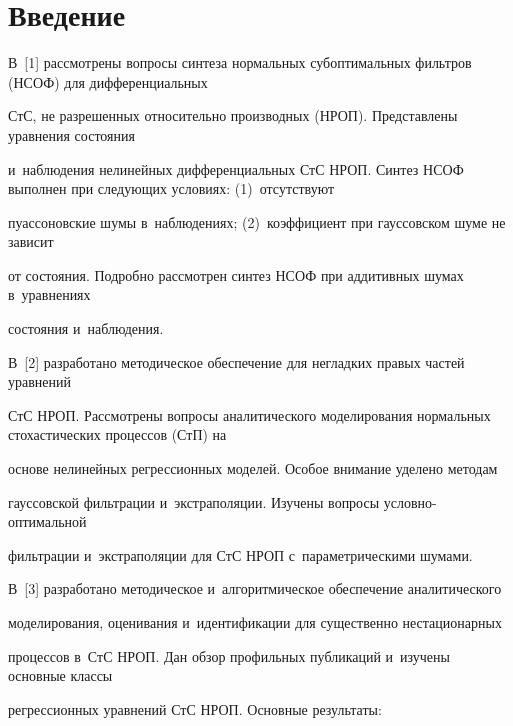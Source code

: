  \thispagestyle{headings}

 

 \vspace*{-22pt}



\section{Введение}



\vspace*{-4pt}





В~[1] рассмотрены вопросы синтеза нормальных субоптимальных фильт\-ров (НСОФ) для дифференциальных 

СтС, не разрешенных относительно производных (НРОП). Представлены уравнения состояния 

и~наблюдения нелинейных дифференциальных СтС НРОП. Синтез НСОФ выполнен при следующих условиях: (1)~отсутствуют 

пуассоновские шумы в~наблюдениях; (2)~коэффициент при гауссовском шуме не зависит 

от состояния. Подробно рассмотрен синтез НСОФ при аддитивных шумах в~уравнениях 

состояния и~наблюдения.

В~[2] разработано методическое обеспечение для негладких правых частей уравнений 

СтС НРОП. Рассмотрены вопросы аналитического моделирования нормальных стохастических процессов (СтП) на 

основе нелинейных регрессионных моделей. Особое внимание уделено методам 

гауссовской фильтрации и~экстраполяции. Изучены вопросы услов\-но-оп\-ти\-маль\-ной 

фильтрации и~экстраполяции для СтС НРОП с~параметрическими шумами.

В~[3] разработано методическое и~алгоритмическое обеспечение аналитического 

моделирования, оценивания и~идентификации для существенно нестационарных 

процессов в~СтС НРОП. Дан обзор профильных публикаций и~изучены основные классы 

регрессионных уравнений СтС НРОП. Основные результаты: 

